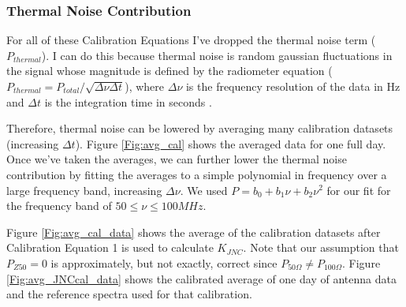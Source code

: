 \subsubsection{Thermal Noise Contribution}

For all of these Calibration Equations I've dropped the thermal noise term ($P_{thermal}$). I can do this because thermal noise is random gaussian fluctuations in the signal whose magnitude is defined by the radiometer equation ($P_{thermal} = P_{total}/\sqrt{\Delta \nu \Delta t}$), where $\Delta \nu$ is the frequency resolution of the data in Hz and $\Delta t$ is the integration time in seconds \cite{stutzman1981}. 

Therefore, thermal noise can be lowered by averaging many calibration datasets (increasing $\Delta t$). Figure \ref{Fig:avg_cal} shows the averaged data for one full day. Once we've taken the averages, we can further lower the thermal noise contribution by fitting the averages to a simple polynomial in frequency over a large frequency band, increasing $\Delta \nu$. We used $P = b_0 + b_1 \nu +b_2 \nu^2$ for our fit for the frequency band of $50 \leq \nu \leq 100MHz$. 

Figure \ref{Fig:avg_cal_data} shows the average of the calibration datasets after Calibration Equation 1 is used to calculate $K_{JNC}$. Note that our assumption that $P_{Z50}=0$ is approximately, but not exactly, correct since $P_{50 \Omega} \neq P_{100 \Omega}$. Figure \ref{Fig:avg_JNCcal_data} shows the calibrated average of one day of antenna data and the reference spectra used for that calibration. 

